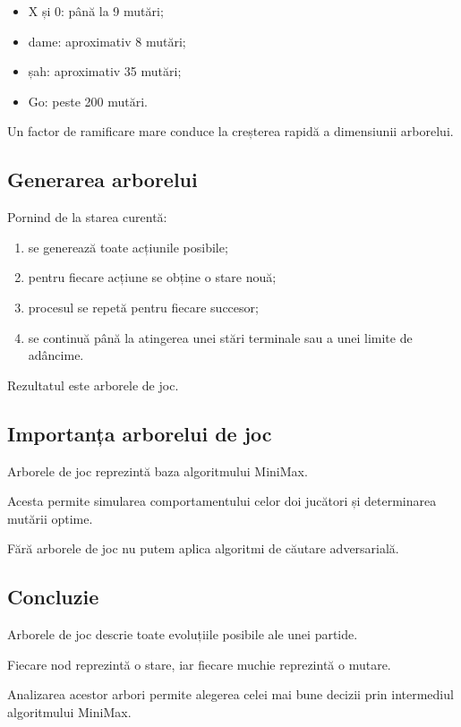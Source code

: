 \documentclass[12pt,a4paper]{article}
\begin{document}
\begin{itemize}
\item X și 0: până la 9 mutări;
\item dame: aproximativ 8 mutări;
\item șah: aproximativ 35 mutări;
\item Go: peste 200 mutări.
\end{itemize}

Un factor de ramificare mare conduce la creșterea rapidă a dimensiunii arborelui.

\subsection{Generarea arborelui}

Pornind de la starea curentă:

\begin{enumerate}
\item se generează toate acțiunile posibile;
\item pentru fiecare acțiune se obține o stare nouă;
\item procesul se repetă pentru fiecare succesor;
\item se continuă până la atingerea unei stări terminale sau a unei limite de adâncime.
\end{enumerate}

Rezultatul este arborele de joc.

\subsection{Importanța arborelui de joc}

Arborele de joc reprezintă baza algoritmului MiniMax.

Acesta permite simularea comportamentului celor doi jucători și determinarea mutării optime.

Fără arborele de joc nu putem aplica algoritmi de căutare adversarială.

\subsection{Concluzie}

Arborele de joc descrie toate evoluțiile posibile ale unei partide.

Fiecare nod reprezintă o stare, iar fiecare muchie reprezintă o mutare.

Analizarea acestor arbori permite alegerea celei mai bune decizii prin intermediul algoritmului MiniMax.
\end{document}
